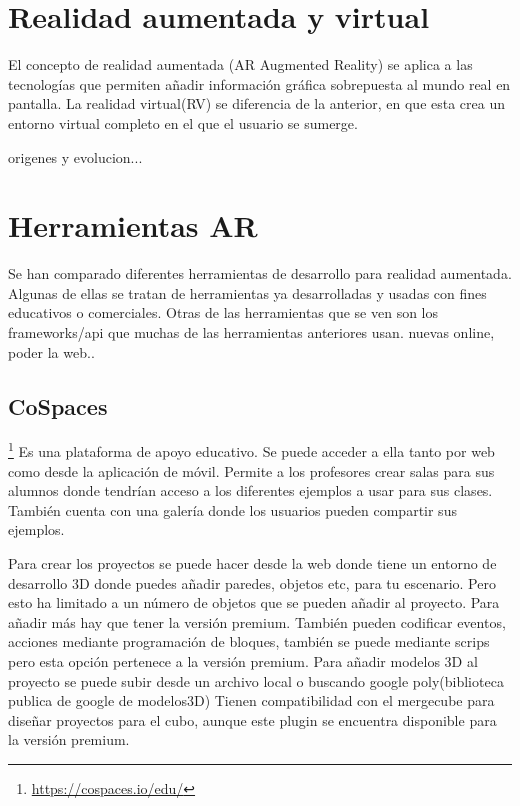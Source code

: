 

\section{Realidad aumentada y virtual}
El concepto de realidad aumentada (AR Augmented Reality) se aplica a las tecnologías que permiten añadir información gráfica sobrepuesta al mundo real en pantalla.
La realidad virtual(RV) se diferencia de la anterior, en que esta crea un entorno virtual completo en el que el usuario se sumerge.
 
origenes y evolucion...




\section{Herramientas AR}
Se han comparado diferentes herramientas de desarrollo para realidad aumentada. Algunas de ellas se tratan de herramientas ya desarrolladas y usadas con fines educativos o comerciales. Otras de las herramientas que se ven son los frameworks/api que muchas de las herramientas anteriores usan.
nuevas online, poder la web.. 

\subsection{CoSpaces}\footnote{\url{https://cospaces.io/edu/}}
Es una plataforma de apoyo educativo. Se puede acceder a ella tanto por web como desde la aplicación de móvil. Permite a los profesores crear salas para sus alumnos donde tendrían acceso a los diferentes ejemplos a usar para sus clases. También cuenta con una galería donde los usuarios pueden compartir sus ejemplos.

Para crear los proyectos se puede hacer desde la web donde tiene un entorno de desarrollo 3D donde puedes añadir paredes, objetos etc, para tu escenario. Pero esto ha limitado a un número de objetos que se pueden añadir al proyecto. Para añadir más hay que tener la versión premium. También pueden codificar eventos, acciones mediante programación de bloques, también se puede mediante scrips pero esta opción pertenece a la versión premium. Para añadir modelos 3D al proyecto se puede subir desde un archivo local o buscando google poly(biblioteca publica de google de modelos3D)
Tienen compatibilidad con el mergecube para diseñar proyectos para el cubo, aunque este plugin se encuentra disponible para la versión premium.

